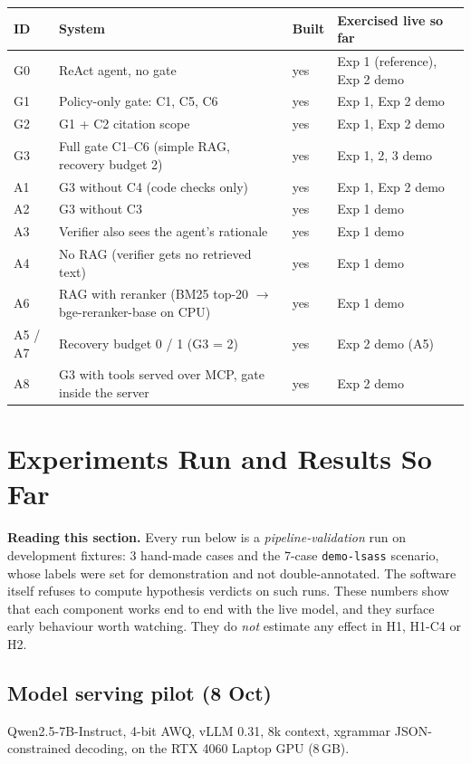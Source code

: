 \documentclass[11pt,a4paper]{article}
\newcommand{\code}[1]{\texttt{\small #1}}
\begin{document}
{\small
\begin{tabularx}{\linewidth}{@{}p{0.7cm}Lp{1.5cm}p{3.6cm}@{}}
\toprule
\textbf{ID} & \textbf{System} & \textbf{Built} & \textbf{Exercised live so far}\\
\midrule
G0 & ReAct agent, no gate & yes & Exp 1 (reference), Exp 2 demo \\
G1 & Policy-only gate: C1, C5, C6 & yes & Exp 1, Exp 2 demo \\
G2 & G1 + C2 citation scope & yes & Exp 1, Exp 2 demo \\
G3 & Full gate C1--C6 (simple RAG, recovery budget 2) & yes & Exp 1, 2, 3 demo \\
A1 & G3 without C4 (code checks only) & yes & Exp 1, Exp 2 demo \\
A2 & G3 without C3 & yes & Exp 1 demo \\
A3 & Verifier also sees the agent's rationale & yes & Exp 1 demo \\
A4 & No RAG (verifier gets no retrieved text) & yes & Exp 1 demo \\
A6 & RAG with reranker (BM25 top-20 $\to$ bge-reranker-base on CPU) & yes & Exp 1 demo \\
A5 / A7 & Recovery budget 0 / 1 (G3 = 2) & yes & Exp 2 demo (A5) \\
A8 & G3 with tools served over MCP, gate inside the server & yes & Exp 2 demo \\
\bottomrule
\end{tabularx}}

\section{Experiments Run and Results So Far}
\label{sec:results}
\textbf{Reading this section.} Every run below is a \emph{pipeline-validation} run on development fixtures: 3 hand-made cases and the 7-case \code{demo-lsass} scenario, whose labels were set for demonstration and not double-annotated. The software itself refuses to compute hypothesis verdicts on such runs. These numbers show that each component works end to end with the live model, and they surface early behaviour worth watching. They do \emph{not} estimate any effect in H1, H1-C4 or H2.

\subsection{Model serving pilot (8 Oct)}
Qwen2.5-7B-Instruct, 4-bit AWQ, vLLM 0.31, 8k context, xgrammar JSON-constrained decoding, on the RTX 4060 Laptop GPU (8\,GB).
\end{document}
